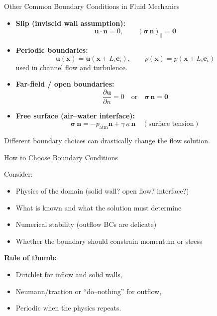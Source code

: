 \documentclass[aspectratio=169]{beamer}
\begin{document}
\begin{frame}{Other Common Boundary Conditions in Fluid Mechanics}

\begin{itemize}
  \item \textbf{Slip (inviscid wall assumption):}
        \[
        \mathbf{u}\cdot\mathbf{n} = 0,
        \qquad
        (\boldsymbol{\sigma}\,\mathbf{n})_\parallel = \mathbf{0}
        \]
  \item \textbf{Periodic boundaries:}
        \[
        \mathbf{u}(\mathbf{x}) = \mathbf{u}(\mathbf{x} + L_i \mathbf{e}_i),
        \qquad
        p(\mathbf{x}) = p(\mathbf{x} + L_i \mathbf{e}_i)
        \]
        used in channel flow and turbulence.
  \item \textbf{Far-field / open boundaries:}
        \[
        \frac{\partial \mathbf{u}}{\partial n} = 0
        \quad\text{or}\quad
        \boldsymbol{\sigma}\,\mathbf{n} = \mathbf{0}
        \]
  \item \textbf{Free surface (air–water interface):}
        \[
        \boldsymbol{\sigma}\,\mathbf{n}
        = -p_{\text{atm}}\mathbf{n}
        + \gamma\,\kappa\,\mathbf{n}
        \quad (\text{surface tension})
        \]
\end{itemize}

Different boundary choices can drastically change the flow solution.

\end{frame}

\begin{frame}{How to Choose Boundary Conditions}

Consider:
\begin{itemize}
  \item Physics of the domain (solid wall? open flow? interface?)
  \item What is known and what the solution must determine
  \item Numerical stability (outflow BCs are delicate)
  \item Whether the boundary should constrain momentum or stress
\end{itemize}

\medskip

\textbf{Rule of thumb:}
\begin{itemize}
  \item Dirichlet for inflow and solid walls,
  \item Neumann/traction or ``do–nothing'' for outflow,
  \item Periodic when the physics repeats.
\end{itemize}

\end{frame}
\end{document}
